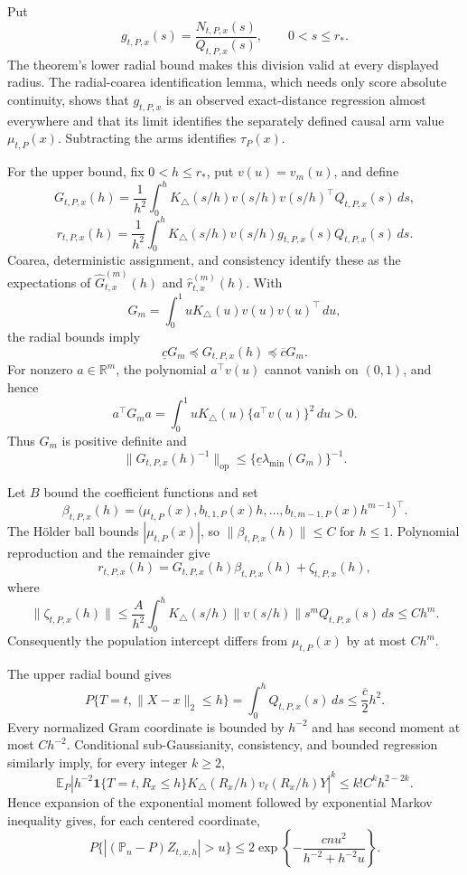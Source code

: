 Put
\[
 g_{t,P,x}(s)=\frac{N_{t,P,x}(s)}{Q_{t,P,x}(s)},
 \qquad 0<s\leq r_*.
\]
The theorem's lower radial bound makes this division valid at every displayed radius.  The radial-coarea identification lemma, which needs only score absolute continuity, shows that \(g_{t,P,x}\) is an observed exact-distance regression almost everywhere and that its limit identifies the separately defined causal arm value \(\mu_{t,P}(x)\).  Subtracting the arms identifies \(\tau_P(x)\).

For the upper bound, fix \(0<h\leq r_*\), put \(v(u)=v_m(u)\), and define
\[
 G_{t,P,x}(h)=\frac1{h^2}\int_0^hK_\triangle(s/h)v(s/h)v(s/h)^\top Q_{t,P,x}(s)\,ds,
\]
\[
 r_{t,P,x}(h)=\frac1{h^2}\int_0^hK_\triangle(s/h)v(s/h)g_{t,P,x}(s)Q_{t,P,x}(s)\,ds.
\]
Coarea, deterministic assignment, and consistency identify these as the expectations of \(\widehat G^{(m)}_{t,x}(h)\) and \(\widehat r^{(m)}_{t,x}(h)\).  With
\[
 G_m=\int_0^1uK_\triangle(u)v(u)v(u)^\top\,du,
\]
the radial bounds imply
\[
 \underline cG_m\preceq G_{t,P,x}(h)\preceq\overline cG_m.
\]
For nonzero \(a\in\mathbb R^m\), the polynomial \(a^\top v(u)\) cannot vanish on \((0,1)\), and hence
\[
 a^\top G_ma=\int_0^1uK_\triangle(u)\{a^\top v(u)\}^2\,du>0.
\]
Thus \(G_m\) is positive definite and
\[
 \lVert G_{t,P,x}(h)^{-1}\rVert_{\mathrm{op}}
 \leq\{\underline c\lambda_{\min}(G_m)\}^{-1}.
\]

Let \(B\) bound the coefficient functions and set
\[
 \beta_{t,P,x}(h)=
 \bigl(\mu_{t,P}(x),b_{t,1,P}(x)h,\ldots,
 b_{t,m-1,P}(x)h^{m-1}\bigr)^\top.
\]
The H\"older ball bounds \(|\mu_{t,P}(x)|\), so \(\|\beta_{t,P,x}(h)\|\leq C\) for \(h\leq1\).  Polynomial reproduction and the remainder give
\[
 r_{t,P,x}(h)=G_{t,P,x}(h)\beta_{t,P,x}(h)+\zeta_{t,P,x}(h),
\]
where
\[
 \|\zeta_{t,P,x}(h)\|
 \leq\frac{A}{h^2}\int_0^hK_\triangle(s/h)\|v(s/h)\|s^mQ_{t,P,x}(s)\,ds
 \leq Ch^m.
\]
Consequently the population intercept differs from \(\mu_{t,P}(x)\) by at most \(Ch^m\).

The upper radial bound gives
\[
 P\{T=t,\lVert X-x\rVert_2\leq h\}
 =\int_0^hQ_{t,P,x}(s)\,ds\leq\frac{\overline c}{2}h^2.
\]
Every normalized Gram coordinate is bounded by \(h^{-2}\) and has second moment at most \(Ch^{-2}\).  Conditional sub-Gaussianity, consistency, and bounded regression similarly imply, for every integer \(k\geq2\),
\[
 \mathbb E_P\left|h^{-2}\mathbf1\{T=t,R_x\leq h\}
 K_\triangle(R_x/h)v_\ell(R_x/h)Y\right|^k
 \leq k!C^kh^{2-2k}.
\]
Hence expansion of the exponential moment followed by exponential Markov inequality gives, for each centered coordinate,
\[
 P\{|(\mathbb P_n-P)Z_{t,x,h}|>u\}
 \leq2\exp\!\left\{-\frac{cnu^2}{h^{-2}+h^{-2}u}\right\}.
\]

